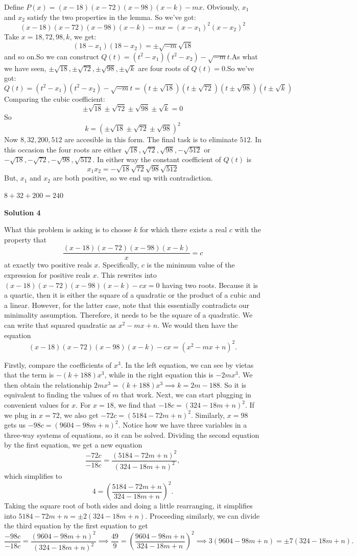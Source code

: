 \begin{enumerate}
 Define $P(x)=(x-18)(x-72)(x-98)(x-k)-mx$. Obviously, $x_1$ and $x_2$ satisfy the two properties in the lemma. So we've got:
 \[(x-18)(x-72)(x-98)(x-k)-mx = (x-x_1)^2(x-x_2)^2\]Take $x=18, 72, 98, k$, we get:
 \[(18-x_1)(18-x_2)= \pm\sqrt{-m}\sqrt{18}\]and so on.So we can construct $Q(t)=(t^2-x_1)(t^2-x_2)-\sqrt{-m}t$.As what we have seen, $\pm\sqrt{18}, \pm\sqrt{72}, \pm\sqrt{98}, \pm\sqrt{k}$ are four roots of $Q(t) = 0$.So we've got:
 \[Q(t)=(t^2-x_1)(t^2-x_2)-\sqrt{-m}t=(t\pm\sqrt{18})(t\pm\sqrt{72})(t\pm\sqrt{98})(t\pm\sqrt{k})\]Comparing the cubic coefficient:
 \[\pm\sqrt{18}\pm\sqrt{72}\pm\sqrt{98}\pm\sqrt{k}=0\]So
 \[k=(\pm\sqrt{18}\pm\sqrt{72}\pm\sqrt{98})^2\]Now $8, 32, 200, 512$ are accesible in this form. The final task is to eliminate $512$. In this occasion the four roots are either $\sqrt{18}, \sqrt{72}, \sqrt{98}, -\sqrt{512}$ or $-\sqrt{18}, -\sqrt{72}, -\sqrt{98}, \sqrt{512}$. In either way the constant coefficient of $Q(t)$ is
 \[x_1x_2 = -\sqrt{18}\sqrt{72}\sqrt{98}\sqrt{512}\]But, $x_1$ and $x_2$ are both positive, so we end up with contradiction.

 $8+32+200=\boxed{240}$




\textbf{Solution 4}

What this problem is asking is to choose $k$ for which there exists a real $c$ with the property that 
 \[\frac{(x-18)(x-72)(x-98)(x-k)}{x}=c\] at exactly two positive reals $x$. Specifically, $c$ is the minimum value of the expression for positive reals $x$. This rewrites into $(x-18)(x-72)(x-98)(x-k)-cx=0$ having two roots. Because it is a quartic, then it is either the square of a quadratic or the product of a cubic and a linear. However, for the latter case, note that this essentially contradicts our minimality assumption. Therefore, it needs to be the square of a quadratic. We can write that squared quadratic as $x^2-mx+n$. We would then have the equation 
 \[(x-18)(x-72)(x-98)(x-k)-cx=\left (x^2-mx+n\right )^2.\]

 Firstly, compare the coefficients of $x^3$. In the left equation, we can see by vietas that the term is $-(k+188)x^3$, while in the right equation this is $-2mx^3$. We then obtain the relationship $2mx^3=(k+188)x^3\implies k=2m-188$. So it is equivalent to finding the values of $m$ that work. Next, we can start plugging in convenient values for $x$. For $x=18$, we find that $-18c=(324-18m+n)^2$. If we plug in $x=72$, we also get $-72c=(5184-72m+n)^2$. Similarly, $x=98$ gets us $-98c=(9604-98m+n)^2$. Notice how we have three variables in a three-way systems of equations, so it can be solved. Dividing the second equation by the first equation, we get a new equation 
 \[\frac{-72c}{-18c}=\frac{(5184-72m+n)^2}{(324-18m+n)^2},\] which simplifies to 
 \[4=\left (\frac{5184-72m+n}{324-18m+n}\right )^2.\] Taking the square root of both sides and doing a little rearranging, it simplifies into $5184-72m+n=\pm 2(324-18m+n)$. Proceeding similarly, we can divide the third equation by the first equation to get 
 \[\frac{-98c}{-18c}=\frac{(9604-98m+n)^2}{(324-18m+n)^2}\implies \frac{49}{9}=\left (\frac{9604-98m+n}{324-18m+n}\right )^2\implies 3(9604-98m+n)=\pm 7(324-18m+n).\]


\end{enumerate}
